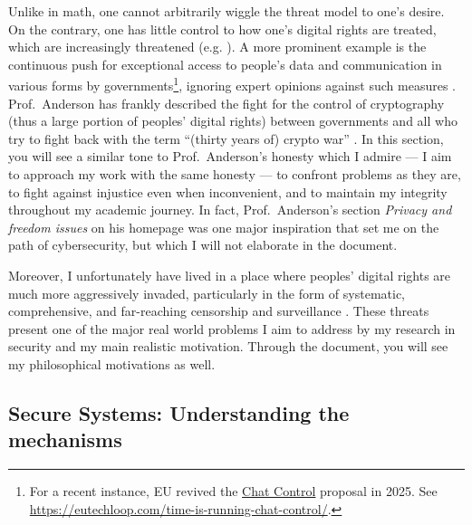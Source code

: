 \documentclass[10pt]{article}
\begin{document}
Unlike in math, one cannot arbitrarily wiggle the threat model to one's desire.
On the contrary, one has little control to how one's digital rights are
treated, which are increasingly threatened (e.g. \cite{eu.digital.1,
eu.digital.2, internet.shutdown.2024}). A more prominent example is the
continuous push for exceptional access to people's data and communication in
various forms by governments\footnote{ For a recent instance, EU revived the
\href{
https://eur-lex.europa.eu/legal-content/EN/TXT/?uri=COM\%3A2022\%3A209\%3AFIN}
{Chat Control} proposal in 2025. See \url{
https://eutechloop.com/time-is-running-chat-control/}.}, ignoring expert
opinions against such measures \cite{keys.under.doormats, bugs.in.our.pockets,
chatcontrolchildprotection}. Prof.~Anderson has frankly described the fight for
the control of cryptography (thus a large portion of peoples' digital rights)
between governments and all who try to fight back with the term ``(thirty years
of) crypto war'' \cite{anderson.freedom}. In this section, you will see a
similar tone to Prof.~Anderson's honesty which I admire --- I aim to approach
my work with the same honesty --- to confront problems as they are, to fight
against injustice even when inconvenient, and to maintain my integrity
throughout my academic journey.  In fact, Prof.~Anderson's section
\emph{Privacy and freedom issues} \cite{anderson.freedom} on his homepage was
one major inspiration that set me on the path of cybersecurity, but which I
will not elaborate in the document.

Moreover, I unfortunately have lived in a place where
peoples' digital rights are much more aggressively invaded, particularly in the
form of systematic, comprehensive, and far-reaching censorship and surveillance
\cite{internet.coup} \cite[Sect.~5]{chall.censor.circum}.  These threats
present one of the major real world problems I aim to address by my research in
security and my main realistic motivation. Through the document, you will see
my philosophical motivations as well.

\subsection[Secure Systems]{
Secure Systems: Understanding the mechanisms} 
\label{sec.secure.systems}
\end{document}
